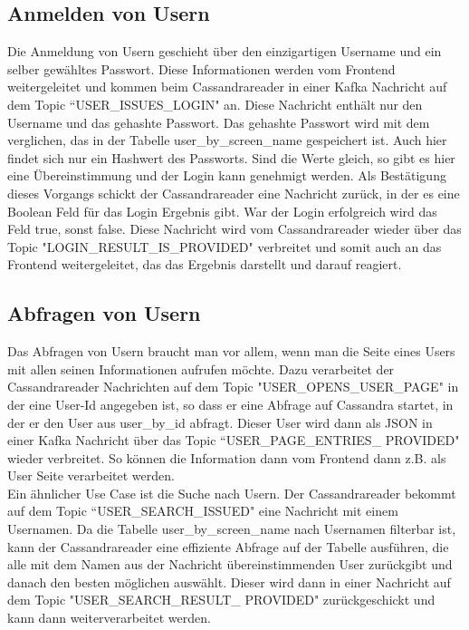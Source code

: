 \subsection{Anmelden von Usern}
Die Anmeldung von Usern geschieht über den einzigartigen Username und ein selber gewähltes Passwort. Diese Informationen werden vom Frontend weitergeleitet und kommen beim Cassandrareader in einer Kafka Nachricht auf dem Topic ``USER\_ISSUES\_LOGIN" an. Diese Nachricht enthält nur den Username und das gehashte Passwort. Das gehashte Passwort wird mit dem verglichen, das in der Tabelle user\_by\_screen\_name gespeichert ist. Auch hier findet sich nur ein Hashwert des Passworts. Sind die Werte gleich, so gibt es hier eine Übereinstimmung und der Login kann genehmigt werden. Als Bestätigung dieses Vorgangs schickt der Cassandrareader eine Nachricht zurück, in der es eine Boolean Feld für das Login Ergebnis gibt. War der Login erfolgreich wird das Feld true, sonst false. Diese Nachricht wird vom Cassandrareader wieder über das Topic "LOGIN\_RESULT\_IS\_PROVIDED" verbreitet und somit auch an das Frontend weitergeleitet, das das Ergebnis darstellt und darauf reagiert.

\subsection{Abfragen von Usern}
\label{subsec:Userabfrage}
Das Abfragen von Usern braucht man vor allem, wenn man die Seite eines Users mit allen seinen Informationen aufrufen möchte. Dazu verarbeitet der Cassandrareader Nachrichten auf dem Topic "USER\_OPENS\_USER\_PAGE" in der eine User-Id angegeben ist, so dass er eine Abfrage auf Cassandra startet, in der er den User aus user\_by\_id abfragt. Dieser User wird dann als JSON in einer Kafka Nachricht über das Topic ``USER\_PAGE\_ENTRIES\_ PROVIDED" wieder verbreitet. So können die Information dann vom Frontend dann z.B. als User Seite verarbeitet werden.\\
Ein ähnlicher Use Case ist die Suche nach Usern. Der Cassandrareader bekommt auf dem Topic ``USER\_SEARCH\_ISSUED" eine Nachricht mit einem Usernamen. Da die Tabelle user\_by\_screen\_name nach Usernamen filterbar ist, kann der Cassandrareader eine effiziente Abfrage auf der Tabelle ausführen, die alle mit dem Namen aus der Nachricht übereinstimmenden User zurückgibt und danach den besten möglichen auswählt. Dieser wird dann in einer Nachricht auf dem Topic "USER\_SEARCH\_RESULT\_ PROVIDED" zurückgeschickt und kann dann weiterverarbeitet werden.

